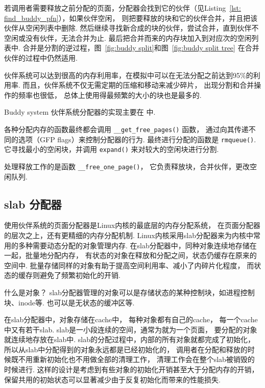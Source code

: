 若调用者需要释放之前分配的页面，分配器会找到它的伙伴（见Listing~\ref{lst: find_buddy_pfn}），如果伙伴空闲，
则把要释放的块和它的伙伴合并，并且把该伙伴从空闲列表中删除.
然后继续寻找新合成的块的伙伴，尝试合并，直到伙伴不空闲或没有伙伴，无法合并为止.
最后把合并而来的内存块加入到对应次的空闲列表中.
合并是分割的逆过程，图~\ref{fig:buddy split}和图~\ref{fig:buddy split tree}
在合并伙伴的过程中仍然适用.

伙伴系统可以达到很高的内存利用率，在模拟中可以在无法分配之前达到95\%的利用率.
而且，伙伴系统不仅无需定期的压缩和移动来减少碎片，
出现分割和合并操作的频率也很低，
总体上使用得最频繁的大小的块也是最多的.\cite{taocp1}

\begin{readsrcbox}{Buddy system}
	伙伴系统分配器的实现主要在  中.

	各种分配内存的函数最终都会调用 \lstinline{__get_free_pages()} 函数，
	通过向其传递不同的选项（GFP flags）来控制分配器的行为.
	最终进行分配的函数是 \lstinline{rmqueue()}.
	它寻找最小的空闲块，并调用 \lstinline{expand()} 来对较大的空闲块进行分割.

	处理释放工作的是函数 \lstinline{__free_one_page()}，
	它负责释放块，合并伙伴，更改空闲队列.
\end{readsrcbox}

\subsection{slab 分配器}
使用伙伴系统的页面分配器是Linux内核的最底层的内存分配系统，
在页面分配器的层次之上，还有更精细的内存分配机制.
Linux内核采用slab分配器来为内核中常用的多种需要动态分配的对象管理内存.
在slab分配器中，同种对象连续地存储在一起，批量地分配内存，
有状态的对象在释放和分配之间，状态仍缓存在原来的空间中.
批量存储同样的对象有助于提高空间利用率、减小了内碎片化程度，
而状态的缓存则避免了频繁初始化的开销.
\cite{bonwick1994slab}
\begin{qbox}{什么是对象？}
	slab分配器管理的对象可以是存储状态的某种控制块，如进程控制块、inode等.
	也可以是无状态的缓冲区等.
\end{qbox}

在slab分配器中，对象存储在cache中，
每种对象都有自己的cache，
每一个cache中又有若干slab.
slab是一小段连续的空间，通常为就为一个页面，
要分配的对象就连续地存放在slab中.
slab的分配过程中，内部的所有对象就都完成了初始化，
所以从slab中分配得到的对象永远都是已经初始化的，
调用者在分配和释放的时候既不用重新初始化也不用做全部的清理工作，
清理工作会在整个slab被销毁的时候进行.
这样的设计是考虑到有些对象的初始化开销甚至大于分配内存的开销，
保留共用的初始状态可以显著减少由于反复初始化而带来的性能损失.\cite{bonwick1994slab}


